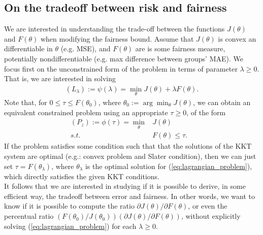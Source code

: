 \documentclass{article}
\begin{document}
\subsection*{On the tradeoff between risk and fairness}


We are interested in understanding the trade-off between the functions $J(\theta)$ and $F(\theta)$ when modifying the fairness bound. Assume that $J(\theta)$ is convex an differentiable in $\theta$ (e.g. MSE), and $F(\theta)$ are is some fairness measure, potentially nondifferentiable (e.g. max difference between groups' MAE). We focus first on the unconstrained form of the problem in terms of parameter $\lambda \geq 0$. That is, we are interested in solving
\begin{align}
    \label{eq:lagrangian_problem}
    (L_\lambda):= \psi(\lambda)=\min_{\theta} J(\theta) + \lambda F(\theta).
\end{align}
Note that, for $0 \leq\tau \leq F(\theta_0)$, where $\theta_0:=\arg\min_{\theta} J(\theta)$, we can obtain an equivalent constrained problem using an appropriate $\tau\geq 0$, of the form 
\begin{equation}
\label{eq:constrained_problem}
\begin{array}{rc}
   ( P_z):= \phi(\tau)=\min_{\theta} &   J(\theta) \quad \quad \quad\\
     s.t. & F(\theta) \leq \tau.
\end{array}
\end{equation}
If the problem satisfies some condition such that that the solutions of the KKT system are optimal (e.g.: convex problem and Slater condition), then we can just set $\tau = F(\theta_{\lambda})$, where $\theta_{\lambda}$ is the optimal solution for (\ref{eq:lagrangian_problem}), which directly satisfies the given KKT conditions. \\

It follows that we are interested in studying if it is possible to derive, in some efficient way, the tradeoff between error and fairness. In other words, we want to know if it is possible to compute the ratio ${\partial J(\theta)}/{\partial F(\theta)}$, or even the percentual ratio $(F(\theta_0)/J(\theta_0))({\partial J(\theta)}/{\partial F(\theta)})$, without explicitly solving (\ref{eq:lagrangian_problem}) for each $\lambda \geq 0$.\\
\end{document}
